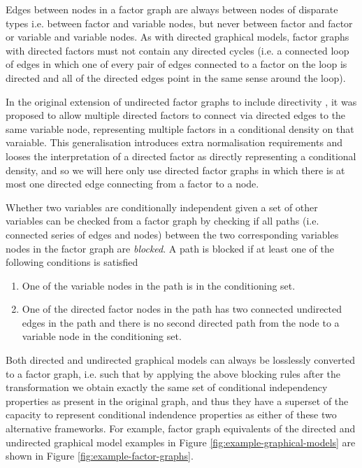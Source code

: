 Edges between nodes in a factor graph are always between nodes of disparate types i.e. between factor and variable nodes, but never between factor and factor or variable and variable nodes. As with directed graphical models, factor graphs with directed factors must not contain any directed cycles (i.e. a connected loop of edges in which one of every pair of edges connected to a factor on the loop is directed and all of the directed edges point in the same sense around the loop). 

In the original extension of undirected factor graphs \citep{frey1997factor} to include directivity \citep{frey2002extending}, it was proposed to allow multiple directed factors to connect via directed edges to the same variable node, representing multiple factors in a conditional density on that varaiable. This generalisation introduces extra normalisation requirements and looses the interpretation of a directed factor as directly representing a conditional density, and so we will here only use directed factor graphs in which there is at most one directed edge connecting from a factor to a node.

Whether two variables are conditionally independent given a set of other variables can be checked from a factor graph by checking if all paths (i.e. connected series of edges and nodes) between the two corresponding variables nodes in the factor graph are \emph{blocked}. A path is blocked if at least one of the following conditions is satisfied \citep{frey2002extending}
\begin{enumerate}
  \item One of the variable nodes in the path is in the conditioning set.
  \item One of the directed factor nodes in the path has two connected undirected edges in the path and there is no second directed path from the node to a variable node in the conditioning set.
\end{enumerate}

Both directed and undirected graphical models can always be losslessly converted to a factor graph, i.e. such that by applying the above blocking rules after the transformation we obtain exactly the same set of conditional independency properties as present in the original graph, and thus they have a superset of the capacity to represent conditional indendence properties as either of these two alternative frameworks. For example, factor graph equivalents of the directed and undirected graphical model examples in Figure \ref{fig:example-graphical-models} are shown in Figure \ref{fig:example-factor-graphs}. 


